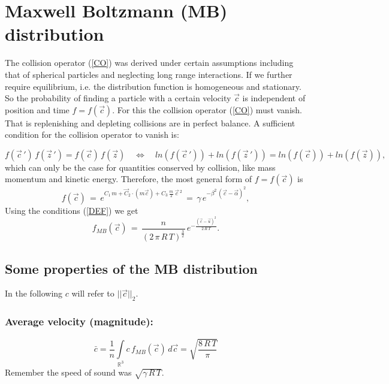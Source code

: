 \section{Maxwell Boltzmann (MB) distribution}

The collision operator (\ref{CO}) was derived under certain assumptions including that of spherical particles and neglecting long range interactions. If we further require equilibrium, i.e. the distribution function is homogeneous and stationary. So the probability of finding a particle with a certain velocity $\vec c$ is independent of position and time $f=f(\vec c)$. For this the collision operator (\ref{CO}) must vanish. That is replenishing and depleting collisions are in perfect balance. A sufficient condition for the collision operator to vanish is:

\begin{equation}
  f(\vec c\, ') \, f(\vec z\, ') = f(\vec c) \, f(\vec z) \quad \Leftrightarrow \quad ln\left(f(\vec c\, ')\right) + ln\left(f(\vec z\, ')\right) = ln\left(f(\vec c)\right) + ln\left(f(\vec z)\right),\label{MBEQ}
\end{equation}
which can only be the case for quantities conserved by collision, like mass momentum and kinetic energy. Therefore, the most general form of $f=f(\vec c)$ is
\begin{equation}
 f(\vec c) \, = \, e^{C_1 \, m + \vec C_2 \cdot (m \vec c) + C_3 \, \frac{m}{2} \, \vec c\,^2} \, = \, \gamma \, e^{-\beta^2 \, (\vec c -\vec \alpha)^2}  ,\nonumber
\end{equation}
Using the conditions (\ref{DEF}) we get
\begin{equation}
 f_{MB}(\vec c) \, = \, \frac{n}{(2 \, \pi \,R \, T )^{\frac{3}{2}}} \, e^{-\frac{(\vec c -\vec u)^2}{2 \,R \, T}}  .\label{MBD}
\end{equation}

\subsection{Some properties of the MB distribution}

In the following $c$ will refer to $||\vec c ||_2$.

\subsubsection{Average velocity (magnitude):}

\begin{equation}
  \bar c = \frac{1}{n} \int \limits_{\mathbb{R}^3} c \, f_{MB}(\vec c) \, d\vec c = \sqrt{\frac{8 \, R \, T}{\pi}}\nonumber
\end{equation}
Remember the speed of sound was $\sqrt{\gamma \, R \, T}$.


